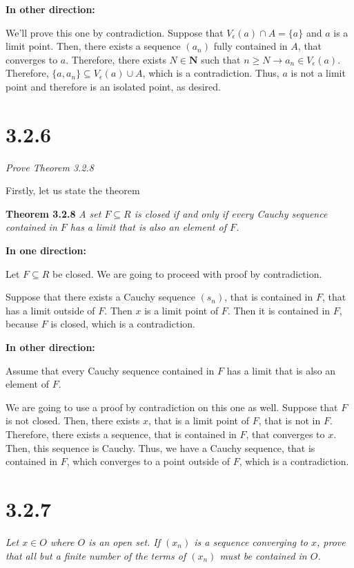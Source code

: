 \documentclass[11pt,oneside,titlepage]{book}
\begin{document}
\textbf{In other direction:}

We'll prove this one by contradiction. Suppose that
$V_\epsilon(a) \cap A = \{a\}$ and $a$ is a limit point. Then, there exists
a sequence $(a_n)$ fully contained in $A$, that converges to $a$. Therefore,
there exists $N \in \textbf{N}$ such that $n \geq N \to a_n \in V_\epsilon(a)$.
Therefore, $\{a, a_n\} \subseteq V_\epsilon(a) \cup A$, which is a
contradiction. Thus, $a$ is not a limit point and therefore is an isolated
point, as desired.

\section*{3.2.6}

\textit{Prove Theorem 3.2.8}

Firstly, let us state the theorem

\textbf{Theorem 3.2.8}
\textit{A set $F \subseteq R$ is closed if and only if every Cauchy sequence
  contained in $F$ has a limit that is also an element of $F$. }

\textbf{In one direction:}

Let  $F \subseteq R$ be closed. We are going to proceed with proof by
contradiction.

Suppose that there exists a Cauchy sequence $(s_n)$, that is contained in $F$,
that has a limit outside of $F$. Then $x$ is a limit point of $F$. Then it is
contained in $F$, because $F$ is closed, which is a contradiction.

\textbf{In other direction:}

Assume that every Cauchy sequence  contained in $F$ has a limit
that is also an element of $F$.

We are going to use a proof by contradiction on this one as well. Suppose that
$F$ is not closed. Then, there exists $x$, that is a limit point of $F$, that
is not in $F$. Therefore, there exists a sequence, that is contained in $F$,
that converges to $x$. Then, this sequence is Cauchy. Thus, we have a Cauchy
sequence, that is contained in $F$, which converges to a point outside of $F$,
which is a contradiction.

\section*{3.2.7}
\textit{Let $x \in O$ where $O$ is an open set. If $(x_n)$ is a sequence
  converging to $x$, prove that all but a finite number of the terms of
  $(x_n)$ must be contained in $O$. }
\end{document}
